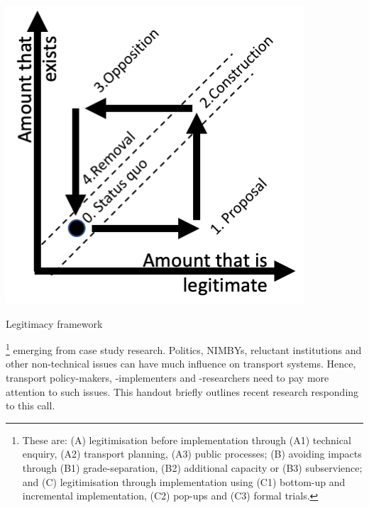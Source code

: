 \documentclass{tufte-handout}
\begin{document}
\begin{marginfigure}%
  \includegraphics[width=\linewidth]{Figure2}
  \caption{Legitimacy framework}
  \label{fig:FIgure2}
\end{marginfigure}







\footnote{These are: (A) legitimisation before implementation through (A1) technical enquiry, (A2) transport planning, (A3) public processes; (B) avoiding impacts through (B1) grade-separation, (B2) additional capacity or (B3) subservience; and (C) legitimisation through implementation using (C1) bottom-up and incremental implementation, (C2) pop-ups and (C3) formal trials.} emerging from case study research. Politics, NIMBYs, reluctant institutions and other non-technical issues can have much influence on transport systems. Hence, transport policy-makers, -implementers and -researchers need to pay more attention to such issues\cite{Marsden:2017aa}. This handout briefly outlines recent research\citep{Reynolds:2020aa} responding to this call.  


\end{document}
